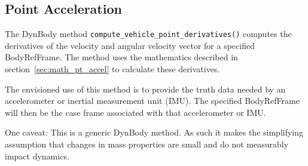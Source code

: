 \subsection{Point Acceleration}
The DynBody method \verb+compute_vehicle_point_derivatives()+
computes the derivatives of the velocity and angular velocity vector for
a specified BodyRefFrame. The method uses the mathematics described in
section~\ref{sec:math_pt_accel} to calculate these derivatives.

The envisioned use of this method is to provide the truth data needed by an
accelerometer or inertial measurement unit (IMU). The specified BodyRefFrame
will then be the case frame associated with that accelerometer or IMU.

One caveat: This is a generic DynBody method. As such it makes the simplifying
assumption that changes in mass properties are small and do not measurably
impact dynamics.
